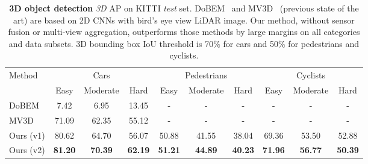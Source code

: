 \begin{table}[t!]
\small
\centering
\begin{tabular}{l||ccc||ccc||ccc}
\hline
\multirow{2}{*}{Method} & \multicolumn{3}{c||}{Cars} & \multicolumn{3}{c||}{Pedestrians} & \multicolumn{3}{c}{Cyclists} \\ \cline{2-10} 
                        & Easy  & Moderate  & Hard  & Easy     & Moderate    & Hard    & Easy    & Moderate   & Hard   \\ \hline
DoBEM~\cite{yuvehicle} & 7.42 & 6.95 & 13.45 & - & - & - & - & - & - \\
MV3D~\cite{cvpr17chen} & 71.09 & 62.35 & 55.12 & - & - & - & - & - & - \\ \hline
Ours (v1) & 80.62 & 64.70 & 56.07 & 50.88 & 41.55 & 38.04 & 69.36 & 53.50 & 52.88 \\
Ours (v2) & \textbf{81.20} & \textbf{70.39} & \textbf{62.19} & \textbf{51.21} & \textbf{44.89} & \textbf{40.23} & \textbf{71.96} & \textbf{56.77} & \textbf{50.39} \\ \hline
\end{tabular}
\caption{\textbf{3D object detection} \emph{3D} AP on KITTI \emph{test} set. DoBEM~\cite{yuvehicle} and MV3D~\cite{cvpr17chen} (previous state of the art) are based on 2D CNNs with bird's eye view LiDAR image.
Our method, without sensor fusion or multi-view aggregation, outperforms those methods by large margins on all categories and data subsets. 3D bounding box IoU threshold is 70\% for cars and 50\% for pedestrians and cyclists.}
\label{tab:kitti_test_3d_detection}
\end{table}

